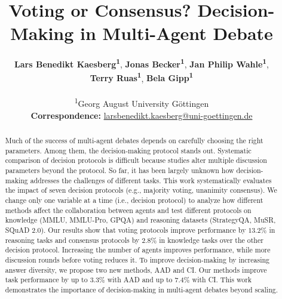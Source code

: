 \documentclass[11pt]{article}
\title{Voting or Consensus? Decision-Making in Multi-Agent Debate}
\author{
 \textbf{Lars Benedikt Kaesberg\textsuperscript{1}},
 \textbf{Jonas Becker\textsuperscript{1}},
 \textbf{Jan Philip Wahle\textsuperscript{1}},
 \\
 \textbf{Terry Ruas\textsuperscript{1}},
 \textbf{Bela Gipp\textsuperscript{1}}
\\
\\
 \textsuperscript{1}Georg August University Göttingen
\\
 \small{
   \textbf{Correspondence:} \href{mailto:larsbenedikt.kaesberg@uni-goettingen.de}{larsbenedikt.kaesberg@uni-goettingen.de}
 }
}
\begin{document}
\maketitle
\begin{abstract}

Much of the success of multi-agent debates depends on carefully choosing the right parameters.
Among them, the decision-making protocol stands out. 
Systematic comparison of decision protocols is difficult because studies alter multiple discussion parameters beyond the protocol.
So far, it has been largely unknown how decision-making addresses the challenges of different tasks.
This work systematically evaluates the impact of seven decision protocols (e.g., majority voting, unanimity consensus).
We change only one variable at a time (i.e., decision protocol) to analyze how different methods affect the collaboration between agents and test different protocols on knowledge (MMLU, MMLU-Pro, GPQA) and reasoning datasets (StrategyQA, MuSR, SQuAD 2.0).
Our results show that voting protocols improve performance by $13.2\%$ in reasoning tasks and consensus protocols by $2.8\%$ in knowledge tasks over the other decision protocol.
Increasing the number of agents improves performance, while more discussion rounds before voting reduces it.
To improve decision-making by increasing answer diversity, we propose two new methods, \ac{AAD} and \ac{CI}.
Our methods improve task performance by up to $3.3\%$ with \ac{AAD} and up to $7.4\%$ with \ac{CI}. 
This work demonstrates the importance of decision-making in multi-agent debates beyond scaling.


\end{abstract}













\clearpage
\appendix


\end{document}
